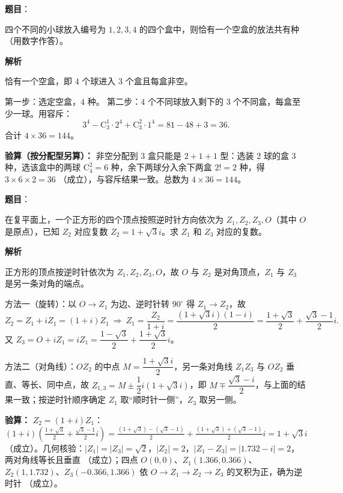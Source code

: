 \begin{answer}

\textbf{题目}：

四个不同的小球放入编号为 $1,2,3,4$ 的四个盒中，则恰有一个空盒的放法共有\underline{\qquad\qquad}种（用数字作答）。

\textbf{解析}

恰有一个空盒，即 $4$ 个球进入 $3$ 个盒且每盒非空。

第一步：选定空盒，$4$ 种。
第二步：$4$ 个不同球放入剩下的 $3$ 个不同盒，每盒至少一球。用容斥：
\nopagebreak[4]
\[3^4-\mathrm C_3^1\cdot2^4+\mathrm C_3^2\cdot1^4=81-48+3=36.\]
合计 $4\times36=144$。

\textbf{验算（按分配型另算）：} 非空分配到 $3$ 盒只能是 $2+1+1$ 型：选装 $2$ 球的盒 $3$ 种，选该盒中的两球 $\mathrm C_4^2=6$ 种，余下两球分入余下两盒 $2!=2$ 种，得 $3\times6\times2=36$ （成立），与容斥结果一致。总数为 $4\times36=144$。


\par\medskip

\end{answer}
\begin{answer}

\textbf{题目}：

在复平面上，一个正方形的四个顶点按照逆时针方向依次为 $Z_1,Z_2,Z_3,O$（其中 $O$ 是原点），已知 $Z_2$ 对应复数 $Z_2=1+\sqrt3i$。求 $Z_1$ 和 $Z_3$ 对应的复数。

\textbf{解析}

正方形的顶点按逆时针依次为 $Z_1,Z_2,Z_3,O$，故 $O$ 与 $Z_2$ 是对角顶点，$Z_1$ 与 $Z_3$ 是另一条对角的端点。

方法一（旋转）：以 $O\to Z_1$ 为边、逆时针转 $90^\circ$ 得 $Z_1\to Z_2$，故
\nopagebreak[4]
\[Z_2=Z_1+iZ_1=(1+i)Z_1\ \Longrightarrow\ Z_1=\frac{Z_2}{1+i}=\frac{(1+\sqrt3 i)(1-i)}{2}=\frac{1+\sqrt3}{2}+\frac{\sqrt3-1}{2}i.\]
又 $Z_3=O+iZ_1=iZ_1=\dfrac{1-\sqrt3}{2}+\dfrac{1+\sqrt3}{2}i$。

方法二（对角线）：$OZ_2$ 的中点 $M=\dfrac{1+\sqrt3 i}{2}$，另一条对角线 $Z_1Z_3$ 与 $OZ_2$ 垂直、等长、同中点，故 $Z_{1,3}=M\pm\dfrac12 i(1+\sqrt3 i)$，即 $M\mp\dfrac{\sqrt3-i}{2}$，与上面的结果一致；按逆时针顺序确定 $Z_1$ 取“顺时针一侧”，$Z_3$ 取另一侧。

\textbf{验算：} $Z_2=(1+i)Z_1$：$(1+i)\left(\frac{1+\sqrt3}{2}+\frac{\sqrt3-1}{2}i\right)=\frac{(1+\sqrt3)-(\sqrt3-1)}{2}+\frac{(1+\sqrt3)+(\sqrt3-1)}{2}i=1+\sqrt3 i$ （成立）。几何核验：$|Z_1|=|Z_3|=\sqrt2$，$|Z_2|=2$，$|Z_1-Z_3|=|1.732-i|=2$，两对角线等长且垂直 （成立）；四点 $O(0,0)$、$Z_1(1.366,0.366)$、$Z_2(1,1.732)$、$Z_3(-0.366,1.366)$ 依 $O\to Z_1\to Z_2\to Z_3$ 的叉积为正，确为逆时针 （成立）。


\par\medskip

\end{answer}
